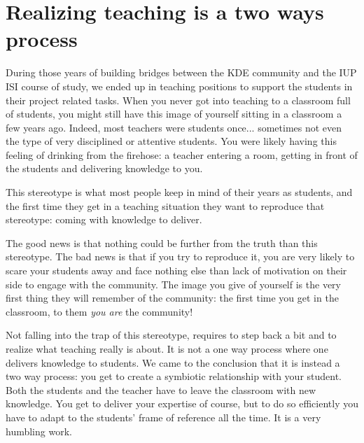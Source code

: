 \section*{Realizing teaching is a two ways process}
During those years of building bridges between the KDE community and the IUP ISI
course of study, we ended up in teaching positions to support the students in
their project related tasks. When you never got into teaching to a classroom
full of students, you might still have this image of yourself sitting in a
classroom a few years ago. Indeed, most teachers were students once... sometimes
not even the type of very disciplined or attentive students. You were likely
having this feeling of drinking from the firehose: a teacher entering a room,
getting in front of the students and delivering knowledge to you.

This stereotype is what most people keep in mind of their years as students, and
the first time they get in a teaching situation they want to reproduce that
stereotype: coming with knowledge to deliver.

The good news is that nothing could be further from the truth than this
stereotype. The bad news is that if you try to reproduce it, you are very likely
to scare your students away and face nothing else than lack of motivation on
their side to engage with the community. The image you give of yourself is the
very first thing they will remember of the community: the first time you get in
the classroom, to them \emph{you are} the community!

Not falling into the trap of this stereotype, requires to step back a bit and to
realize what teaching really is about. It is not a one way process where one
delivers knowledge to students. We came to the conclusion that it is instead a
two way process: you get to create a symbiotic relationship with your student.
Both the students and the teacher have to leave the classroom with new
knowledge. You get to deliver your expertise of course, but to do so efficiently
you have to adapt to the students' frame of reference all the time. It is a very
humbling work.

